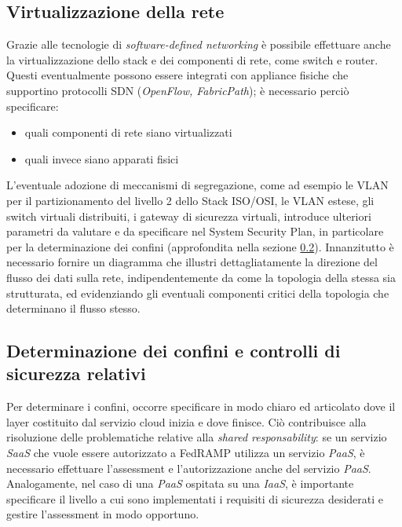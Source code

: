\documentclass[../main.tex]{subfiles}
\begin{document}
\subsection{Virtualizzazione della rete}
Grazie alle tecnologie di \textit{software-defined networking} è possibile effettuare anche la virtualizzazione dello stack e dei componenti di rete, come switch e router. Questi eventualmente possono essere integrati con appliance fisiche che supportino protocolli SDN (\textit{OpenFlow, FabricPath}); è necessario perciò specificare:
\begin{itemize}
    \item quali componenti di rete siano virtualizzati
    \item quali invece siano apparati fisici
\end{itemize}
L'eventuale adozione di meccanismi di segregazione, come ad esempio le VLAN per il partizionamento del livello 2 dello Stack ISO/OSI, le VLAN estese, gli switch virtuali distribuiti, i gateway di sicurezza virtuali, introduce ulteriori parametri da valutare e da specificare nel System Security Plan, in particolare per la determinazione dei confini (approfondita nella sezione \ref{subsec:confini}).
Innanzitutto è necessario fornire un diagramma che illustri dettagliatamente la direzione del flusso dei dati sulla rete, indipendentemente da come la topologia della stessa sia strutturata, ed evidenziando gli eventuali componenti critici della topologia che determinano il flusso stesso.


\subsection {Determinazione dei confini e controlli di sicurezza relativi}
\label{subsec:confini}
Per determinare i confini, occorre specificare in modo chiaro ed articolato dove il layer costituito dal servizio cloud inizia e dove finisce.
Ciò contribuisce alla risoluzione delle problematiche relative alla \textit{shared responsability}: se un servizio \textit{SaaS} che vuole essere autorizzato a FedRAMP utilizza un servizio \textit{PaaS}, è necessario effettuare l'assessment e l'autorizzazione anche del servizio \textit{PaaS}.
Analogamente, nel caso di una \textit{PaaS} ospitata su una \textit{IaaS}, è importante specificare il livello a cui sono implementati i requisiti di sicurezza desiderati e gestire l'assessment in modo opportuno.
\end{document}
